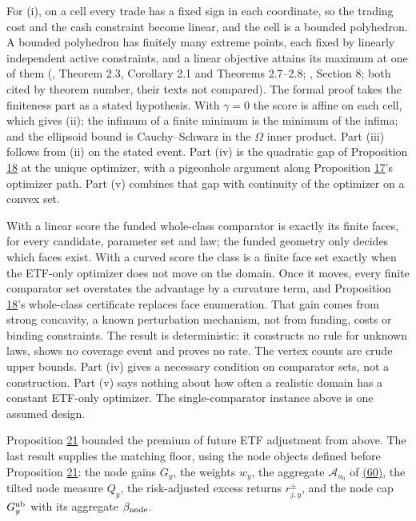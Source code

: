 \documentclass[11pt]{article}
\begin{document}
For (i), on a cell every trade has a fixed sign in each coordinate, so
the trading cost and the cash constraint become linear, and the cell
is a bounded polyhedron. A bounded polyhedron has finitely many
extreme points, each fixed by linearly independent active
constraints, and a linear objective attains its maximum at one of them
(\cite{bertsimas1997introduction}, Theorem 2.3, Corollary 2.1 and
Theorems 2.7--2.8; \cite{schrijver1986theory}, Section 8; both cited by
theorem number, their texts not compared). The formal proof takes
the finiteness part as a stated hypothesis. With \(\gamma=0\) the score
is affine on each cell, which gives (ii); the infimum of a finite
minimum is the minimum of the infima; and the ellipsoid bound is
Cauchy--Schwarz in the \(\Omega\) inner product. Part (iii) follows
from (ii) on the stated event. Part (iv) is the quadratic gap of
Proposition \hyperref[res:Proposition-18]{18} at the unique optimizer, with a pigeonhole argument
along Proposition \hyperref[res:Proposition-17]{17}'s optimizer path. Part (v) combines that gap with
continuity of the optimizer on a convex set.

With a linear score the funded whole-class comparator is exactly its
finite faces, for every candidate, parameter set and law; the funded
geometry only decides which faces exist. With a curved score the
class is a finite face set exactly when the ETF-only optimizer does
not move on the domain. Once it moves, every finite comparator set
overstates the advantage by a curvature term, and Proposition \hyperref[res:Proposition-18]{18}'s
whole-class certificate replaces face enumeration. That gain comes
from strong concavity, a known perturbation mechanism, not from
funding, costs or binding constraints. The result is deterministic:
it constructs no rule for unknown laws, shows no coverage event and
proves no rate. The vertex counts are crude upper bounds. Part (iv)
gives a necessary condition on comparator sets, not a construction.
Part (v) says nothing about how often a realistic domain has a
constant ETF-only optimizer. The single-comparator instance above is
one assumed design.

Proposition \hyperref[res:Proposition-21]{21} bounded the premium of future ETF adjustment from
above. The last result supplies the matching floor, using the node
objects defined before Proposition \hyperref[res:Proposition-21]{21}: the node gains \(G_y\), the
weights \(w_y\), the aggregate \(\mathcal A_{u_0}\) of \hyperref[eq:60]{(60)}, the tilted
node measure \(Q_y\), the risk-adjusted excess returns
\(r^\pm_{j,y}\), and the node cap \(G^{\rm ub}_y\) with its aggregate
\(\beta_{\rm node}\).
\end{document}
